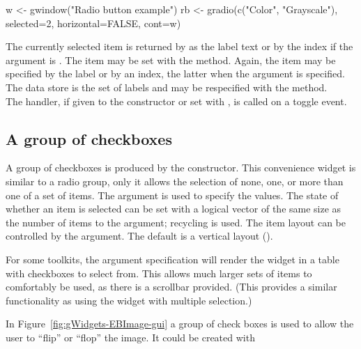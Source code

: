 \begin{Schunk}
\begin{Sinput}
 w <- gwindow("Radio button example")
 rb <- gradio(c("Color", "Grayscale"), selected=2, 
              horizontal=FALSE, cont=w)
\end{Sinput}
\end{Schunk}


The currently selected item is returned by  as
the label text or by the index if the argument  is
. The item may be set with the
 method. Again, the item may be
specified by the label or by an index, the latter when the argument
 is specified. 
\\

The data store is the set of labels and may be respecified with the
\method{[\ASSIGN}{gradio} method.
\\

The handler, if given to the constructor or set with
, is called on a toggle event.

\subsection{A group of checkboxes}
\label{sec:gWidgets-group-checkboxes}


A group of checkboxes is produced by the
 constructor. This convenience widget is
similar to a radio group, only it allows the selection of none, one,
or more than one of a set of items.  The
 argument is used to specify the
values. The state of whether an item is selected can be set with a
logical vector of the same size as the number of items to the
 argument; recycling is used. The
item layout can be controlled by the
 argument. The default is a
vertical layout ().


For some toolkits, the argument specification 
will render the widget in a table with checkboxes to select from. This
allows much larger sets of items to comfortably be used, as there is a
scrollbar provided. (This provides a similar functionality as using
the  widget with multiple selection.)


In Figure~\ref{fig:gWidgets-EBImage-gui} a group of check boxes is
used to allow the user to ``flip'' or ``flop'' the image. It could be
created with


